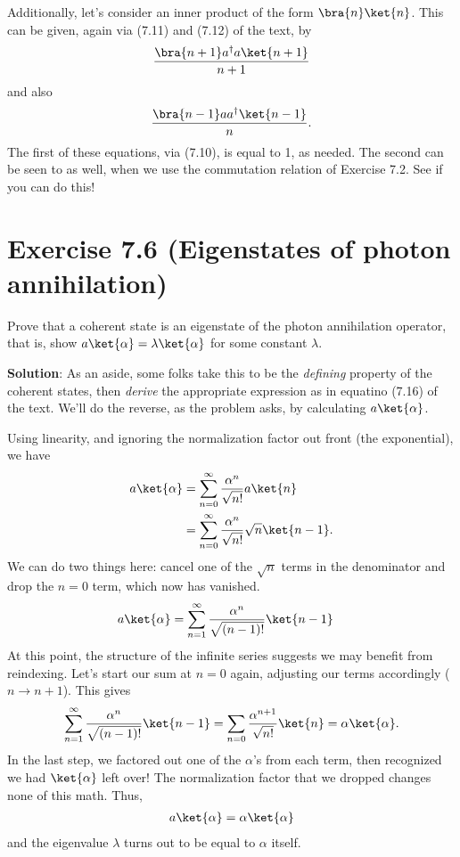 \documentclass{book}
\begin{document}
    Additionally, let's consider an inner product of the form $\bra{n}\ket{n}$. This can be given, again via (7.11) and (7.12) of the text, by
    \begin{align}
        \frac{\bra{n+1}a^\dagger a \ket{n+1}}{n+1}
    \end{align}
    and also 
    \begin{align}
        \frac{\bra{n-1}a a^\dagger \ket{n-1}}{n}.
    \end{align}
    The first of these equations, via (7.10), is equal to 1, as needed. The second can be seen to as well, when we use the commutation relation of Exercise 7.2. See if you can do this!

\section*{Exercise 7.6 (Eigenstates of photon annihilation)}
    Prove that a coherent state is an eigenstate of the photon annihilation operator, that is, show $a\ket{\alpha} = \lambda \ket{\alpha}$ for some constant $\lambda$.

    \textbf{Solution}: As an aside, some folks take this to be the \emph{defining} property of the coherent states, then \emph{derive} the appropriate expression as in equatino (7.16) of the text. We'll do the reverse, as the problem asks, by calculating $a\ket{\alpha}$.

    Using linearity, and ignoring the normalization factor out front (the exponential), we have
    \begin{align}
    \begin{aligned}
        a\ket{\alpha} &= \sum_{n=0}^\infty \frac{\alpha^n}{\sqrt{n!}} a \ket{n} \\
        &= \sum_{n=0}^\infty \frac{\alpha^n}{\sqrt{n!}} \sqrt{n} \ket{n-1}.
    \end{aligned}
    \end{align}
    We can do two things here: cancel one of the $\sqrt{n}$ terms in the denominator and drop the $n = 0$ term, which now has vanished.
    \begin{align}
        a\ket{\alpha} &= \sum_{n=1}^\infty \frac{\alpha^n}{\sqrt{(n-1)!}}  \ket{n-1}
    \end{align}
    At this point, the structure of the infinite series suggests we may benefit from reindexing. Let's start our sum at $n = 0$ again, adjusting our terms accordingly ($n \to n + 1$). This gives
    \begin{align}
        \sum_{n=1}^\infty \frac{\alpha^n}{\sqrt{(n-1)!}}  \ket{n-1} = \sum_{n=0}\frac{\alpha^{n+1}}{\sqrt{n!}}  \ket{n} = \alpha \ket{\alpha}.
    \end{align}
    In the last step, we factored out one of the $\alpha$'s from each term, then recognized we had $\ket{\alpha}$ left over! The normalization factor that we dropped changes none of this math. Thus,
    \begin{align}
        a \ket{\alpha} = \alpha \ket{\alpha}
    \end{align}
    and the eigenvalue $\lambda$ turns out to be equal to $\alpha$ itself.
\end{document}
